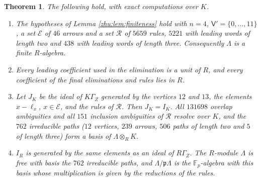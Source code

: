 \documentclass[leqno]{article}
\newcommand{\ot}{\otimes}
\newtheorem{thm}{Theorem}[section]
\numberwithin{equation}{section}
\begin{document}
\begin{thm}
\label{zhu:thm:order}
The following hold, with exact computations over $K$.
\begin{enumerate}
\item The hypotheses of Lemma \ref{zhu:lem:finiteness} hold with $n = 4$, $\mathsf V' = \{0, \ldots, 11\}$, a set $\mathcal E$ of $46$ arrows and a set $\mathcal R$ of $5659$ rules, $5221$ with leading words of length two and $438$ with leading words of length three. Consequently $\Lambda$ is a finite $R$-algebra.
\item Every leading coefficient used in the elimination is a unit of $R$, and every coefficient of the final eliminations and rules lies in $R$.
\item Let $J_K$ be the ideal of $K\Gamma_Z$ generated by the vertices $12$ and $13$, the elements $x - \ell_x$, $x \in \mathcal E$, and the rules of $\mathcal R$. Then $J_K = I_K$. All $131698$ overlap ambiguities and all $151$ inclusion ambiguities of $\mathcal R$ resolve over $K$, and the $762$ irreducible paths ($12$ vertices, $239$ arrows, $506$ paths of length two and $5$ of length three) form a basis of $\Lambda \ot_R K$.
\item $I_R$ is generated by the same elements as an ideal of $R\Gamma_Z$. The $R$-module $\Lambda$ is free with basis the $762$ irreducible paths, and $\Lambda/\mathfrak p\Lambda$ is the $\mathbb F_p$-algebra with this basis whose multiplication is given by the reductions of the rules.
\end{enumerate}
\end{thm}
\end{document}
